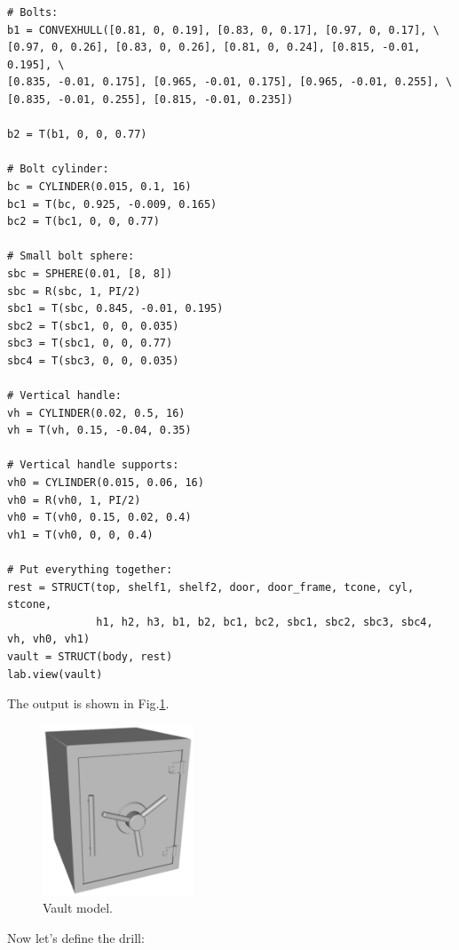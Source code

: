 {\small
\begin{bbox}
\begin{verbatim}
# Bolts:
b1 = CONVEXHULL([0.81, 0, 0.19], [0.83, 0, 0.17], [0.97, 0, 0.17], \ 
[0.97, 0, 0.26], [0.83, 0, 0.26], [0.81, 0, 0.24], [0.815, -0.01, 0.195], \
[0.835, -0.01, 0.175], [0.965, -0.01, 0.175], [0.965, -0.01, 0.255], \
[0.835, -0.01, 0.255], [0.815, -0.01, 0.235])

b2 = T(b1, 0, 0, 0.77)

# Bolt cylinder:
bc = CYLINDER(0.015, 0.1, 16)
bc1 = T(bc, 0.925, -0.009, 0.165)
bc2 = T(bc1, 0, 0, 0.77)

# Small bolt sphere:
sbc = SPHERE(0.01, [8, 8])
sbc = R(sbc, 1, PI/2)
sbc1 = T(sbc, 0.845, -0.01, 0.195)
sbc2 = T(sbc1, 0, 0, 0.035)
sbc3 = T(sbc1, 0, 0, 0.77)
sbc4 = T(sbc3, 0, 0, 0.035)

# Vertical handle:
vh = CYLINDER(0.02, 0.5, 16)
vh = T(vh, 0.15, -0.04, 0.35)

# Vertical handle supports:
vh0 = CYLINDER(0.015, 0.06, 16)
vh0 = R(vh0, 1, PI/2)
vh0 = T(vh0, 0.15, 0.02, 0.4)
vh1 = T(vh0, 0, 0, 0.4)

# Put everything together:
rest = STRUCT(top, shelf1, shelf2, door, door_frame, tcone, cyl, stcone, 
              h1, h2, h3, b1, b2, bc1, bc2, sbc1, sbc2, sbc3, sbc4, vh, vh0, vh1)
vault = STRUCT(body, rest)
lab.view(vault)
\end{verbatim}
\end{bbox}
}
\vspace{6mm}

\noindent
The output is shown in Fig.\ref{fig:vault}.
\newpage

\begin{figure}[!ht]
\begin{center}
\includegraphics[width=0.4\textwidth]{img/vault.png}
\end{center}
\vspace{-4mm}
\caption{Vault model.}
\label{fig:vault}
\end{figure}
\noindent
Now let's define the drill: \\


